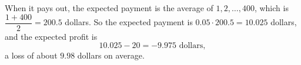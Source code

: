 When it pays out, the expected payment is the average of $1,2,\dots,400$, which is $\dfrac{1+400}{2}=200.5$ dollars. So the expected payment is $0.05\cdot200.5=10.025$ dollars, and the expected profit is
\[10.025-20=\boxed{-9.975\text{ dollars}},\]
a loss of about $9.98$ dollars on average.
